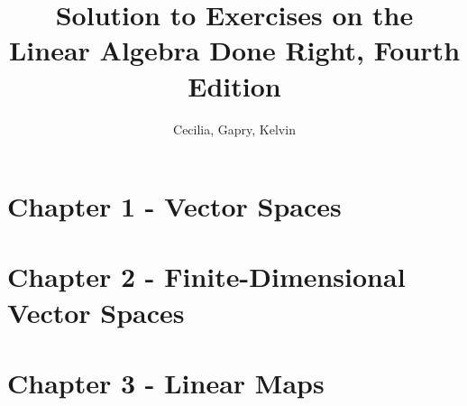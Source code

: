 \documentclass{article}
\title{Solution to Exercises on the \\Linear Algebra Done Right, Fourth Edition}
\author{Cecilia, Gapry, Kelvin}
\begin{document}
\maketitle

\section*{Chapter 1 - Vector Spaces}




\section*{Chapter 2 - Finite-Dimensional Vector Spaces}




\section*{Chapter 3 - Linear Maps}

\end{document}
